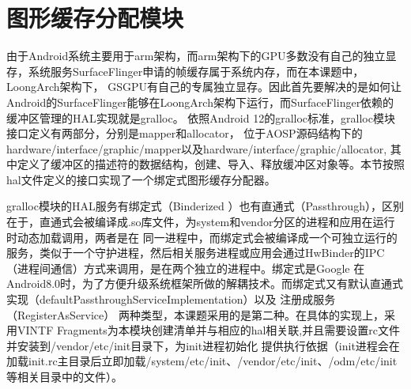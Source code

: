 







\section{图形缓存分配模块}
由于Android系统主要用于arm架构，而arm架构下的GPU多数没有自己的独立显存，系统服务SurfaceFlinger申请的帧缓存属于系统内存，而在本课题中，LoongArch架构下，
GSGPU有自己的专属独立显存。因此首先要解决的是如何让Android的SurfaceFlinger能够在LoongArch架构下运行，而SurfaceFlinger依赖的缓冲区管理的HAL实现就是gralloc。
依照Android 12的gralloc标准，gralloc模块接口定义有两部分，分别是mapper和allocator，
位于AOSP源码结构下的hardware/interface/graphic/mapper以及hardware/interface/graphic/allocator,
其中定义了缓冲区的描述符的数据结构，创建、导入、释放缓冲区对象等。本节按照hal文件定义的接口实现了一个绑定式图形缓存分配器。

gralloc模块的HAL服务有绑定式（Binderized ）也有直通式（Passthrough），区别在于，直通式会被编译成.so库文件，为system和vendor分区的进程和应用在运行时动态加载调用，两者是在
同一进程中，而绑定式会被编译成一个可独立运行的服务，类似于一个守护进程，然后相关服务进程或应用会通过HwBinder的IPC（进程间通信）方式来调用，是在两个独立的进程中。绑定式是Google
在Android8.0时，为了方便升级系统框架所做的解耦技术。而绑定式又有默认直通式实现（defaultPassthroughServiceImplementation）以及 注册成服务（RegisterAsService）
两种类型，本课题采用的是第二种。在具体的实现上，采用VINTF Fragments为本模块创建清单并与相应的hal相关联,并且需要设置rc文件并安装到/vendor/etc/init目录下，为init进程初始化
提供执行依据（init进程会在加载init.rc主目录后立即加载/system/etc/init、/vendor/etc/init、/odm/etc/init等相关目录中的文件）。

